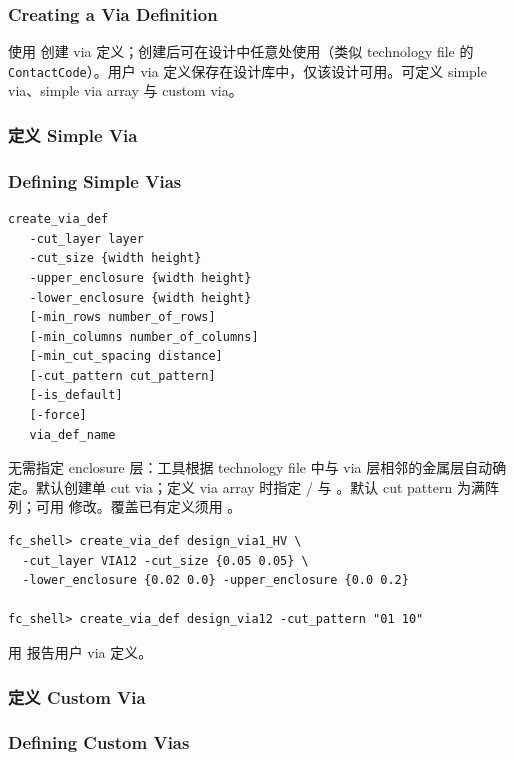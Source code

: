 \subsubsection*{Creating a Via Definition}

使用  创建 via 定义；创建后可在设计中任意处使用（类似 technology file 的 \texttt{ContactCode}）。用户 via 定义保存在设计库中，仅该设计可用。可定义 simple via、simple via array 与 custom via。

\subsubsection{定义 Simple Via}
\subsubsection*{Defining Simple Vias}

\begin{lstlisting}
create_via_def
   -cut_layer layer
   -cut_size {width height}
   -upper_enclosure {width height}
   -lower_enclosure {width height}
   [-min_rows number_of_rows]
   [-min_columns number_of_columns]
   [-min_cut_spacing distance]
   [-cut_pattern cut_pattern]
   [-is_default]
   [-force]
   via_def_name
\end{lstlisting}

无需指定 enclosure 层：工具根据 technology file 中与 via 层相邻的金属层自动确定。默认创建单 cut via；定义 via array 时指定 / 与 。默认 cut pattern 为满阵列；可用  修改。覆盖已有定义须用 。

\begin{lstlisting}
fc_shell> create_via_def design_via1_HV \
  -cut_layer VIA12 -cut_size {0.05 0.05} \
  -lower_enclosure {0.02 0.0} -upper_enclosure {0.0 0.2}

fc_shell> create_via_def design_via12 -cut_pattern "01 10"
\end{lstlisting}

用  报告用户 via 定义。

\subsubsection{定义 Custom Via}
\subsubsection*{Defining Custom Vias}

